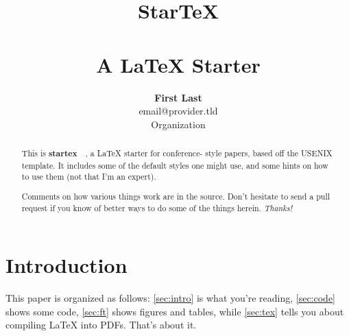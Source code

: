 \documentclass[letterpaper,twocolumn,10pt,final]{article}
\begin{document}
\date{}

\title{\selectfont
    {\huge{\textbf{StarTeX}}}\\
    {\large{\textbf{\\A LaTeX Starter}}}}


\author{
{\rm \textbf{First Last}}\\
{\rm email@provider.tld}\\
Organization\\
} %

\maketitle

\thispagestyle{empty}




\begin{abstract}
This is \textbf{startex}~\cite{startex}~, a LaTeX starter for conference-
style papers, based off the USENIX template. It includes some of the default
styles one might use, and some hints on how to use them (not that I'm an
expert).

Comments on how various things work are in the source. Don't hesitate to send
a pull request if you know of better ways to do some of the things herein.
\textit{Thanks!}
\end{abstract}



\section{\label{sec:intro}Introduction}
This paper is organized as follows: \autoref{sec:intro} is what you're
reading, \autoref{sec:code} shows some code, \autoref{sec:ft} shows figures
and tables, while \autoref{sec:tex} tells you about compiling LaTeX into PDFs.
That's about it.
\end{document}
